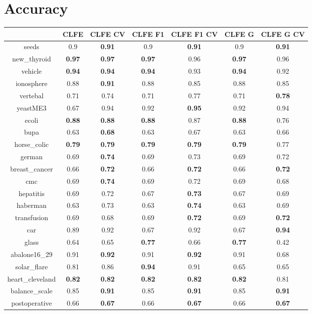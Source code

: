 \documentclass{article}%
\begin{document}
%
\normalsize%
\section*{Accuracy}%
\begin{tabular}{c|cccccc}%
\hline%
&CLFE&CLFE CV&CLFE F1&CLFE F1 CV&CLFE G&CLFE G CV\\%
\hline%
seeds&0.9&\textbf{0.91}&0.9&\textbf{0.91}&0.9&\textbf{0.91}\\%
new\_thyroid&\textbf{0.97}&\textbf{0.97}&\textbf{0.97}&0.96&\textbf{0.97}&0.96\\%
vehicle&\textbf{0.94}&\textbf{0.94}&\textbf{0.94}&0.93&\textbf{0.94}&0.92\\%
ionosphere&0.88&\textbf{0.91}&0.88&0.85&0.88&0.85\\%
vertebal&0.71&0.74&0.71&0.77&0.71&\textbf{0.78}\\%
yeastME3&0.67&0.94&0.92&\textbf{0.95}&0.92&0.94\\%
ecoli&\textbf{0.88}&\textbf{0.88}&\textbf{0.88}&0.87&\textbf{0.88}&0.76\\%
bupa&0.63&\textbf{0.68}&0.63&0.67&0.63&0.66\\%
horse\_colic&\textbf{0.79}&\textbf{0.79}&\textbf{0.79}&\textbf{0.79}&\textbf{0.79}&0.77\\%
german&0.69&\textbf{0.74}&0.69&0.73&0.69&0.72\\%
breast\_cancer&0.66&\textbf{0.72}&0.66&\textbf{0.72}&0.66&\textbf{0.72}\\%
cmc&0.69&\textbf{0.74}&0.69&0.72&0.69&0.68\\%
hepatitis&0.69&0.72&0.67&\textbf{0.73}&0.67&0.69\\%
haberman&0.63&0.73&0.63&\textbf{0.74}&0.63&0.69\\%
transfusion&0.69&0.68&0.69&\textbf{0.72}&0.69&\textbf{0.72}\\%
car&0.89&0.92&0.67&0.92&0.67&\textbf{0.94}\\%
glass&0.64&0.65&\textbf{0.77}&0.66&\textbf{0.77}&0.42\\%
abalone16\_29&0.91&\textbf{0.92}&0.91&\textbf{0.92}&0.91&0.68\\%
solar\_flare&0.81&0.86&\textbf{0.94}&0.91&0.65&0.65\\%
heart\_cleveland&\textbf{0.82}&\textbf{0.82}&\textbf{0.82}&\textbf{0.82}&\textbf{0.82}&0.81\\%
balance\_scale&0.85&\textbf{0.91}&0.85&\textbf{0.91}&0.85&\textbf{0.91}\\%
postoperative&0.66&\textbf{0.67}&0.66&\textbf{0.67}&0.66&\textbf{0.67}\\%
\end{tabular}
\end{document}
